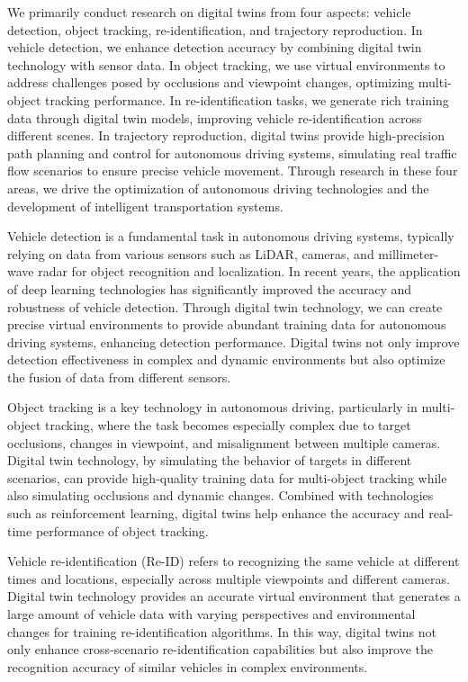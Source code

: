We primarily conduct research on digital twins from four aspects: vehicle detection, object tracking, re-identification, and trajectory reproduction. 
In vehicle detection, we enhance detection accuracy by combining digital twin technology with sensor data. 
In object tracking, we use virtual environments to address challenges posed by occlusions and viewpoint changes, optimizing multi-object tracking performance. 
In re-identification tasks, we generate rich training data through digital twin models, improving vehicle re-identification across different scenes. 
In trajectory reproduction, digital twins provide high-precision path planning and control for autonomous driving systems, simulating real traffic flow scenarios to ensure precise vehicle movement. 
Through research in these four areas, we drive the optimization of autonomous driving technologies and the development of intelligent transportation systems.

Vehicle detection is a fundamental task in autonomous driving systems, typically relying on data from various sensors such as LiDAR, cameras, and millimeter-wave radar for object recognition and localization. 
In recent years, the application of deep learning technologies has significantly improved the accuracy and robustness of vehicle detection. 
Through digital twin technology, we can create precise virtual environments to provide abundant training data for autonomous driving systems, enhancing detection performance. 
Digital twins not only improve detection effectiveness in complex and dynamic environments but also optimize the fusion of data from different sensors\cite{Alpher20}.

Object tracking is a key technology in autonomous driving, particularly in multi-object tracking, where the task becomes especially complex due to target occlusions, changes in viewpoint, and misalignment between multiple cameras. 
Digital twin technology, by simulating the behavior of targets in different scenarios, can provide high-quality training data for multi-object tracking while also simulating occlusions and dynamic changes. 
Combined with technologies such as reinforcement learning, digital twins help enhance the accuracy and real-time performance of object tracking\cite{Alpher22b}.

Vehicle re-identification (Re-ID) refers to recognizing the same vehicle at different times and locations, especially across multiple viewpoints and different cameras. 
Digital twin technology provides an accurate virtual environment that generates a large amount of vehicle data with varying perspectives and environmental changes for training re-identification algorithms. 
In this way, digital twins not only enhance cross-scenario re-identification capabilities but also improve the recognition accuracy of similar vehicles in complex environments\cite{Alpher23}.


